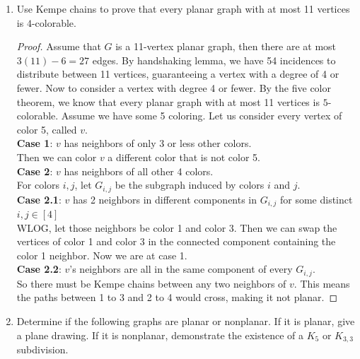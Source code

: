 \documentclass[12pt]{article}
\begin{document}
	\begin{enumerate}

\item Use Kempe chains to prove that every planar graph with at most 11 vertices is $4$-colorable.
\begin{proof}
	Assume that $G$ is a 11-vertex planar graph, then there are at most $3(11)-6=27$ edges. By handshaking lemma, we have 54 incidences to distribute between 11 vertices, guaranteeing a vertex with a degree of 4 or fewer. Now to consider a vertex with degree 4 or fewer.
	By the five color theorem, we know that every planar graph with at most 11 vertices is $5$-colorable. Assume we have some 5 coloring. Let us consider every vertex of color 5, called $v$.\\
	\textbf{Case 1}: $v$ has neighbors of only 3 or less other colors.\\
	Then we can color $v$ a different color that is not color 5.\\
	\textbf{Case 2}: $v$ has neighbors of all other 4 colors.\\
	For colors $i,j$, let $G_{i,j}$ be the subgraph induced by colors $i$ and $j$.\\
	\textbf{Case 2.1}: $v$ has 2 neighbors in different components in $G_{i,j}$ for some distinct $i,j\in [4]$\\
	WLOG, let those neighbors be color 1 and color 3. Then we can swap the vertices of color 1 and color 3 in the connected component containing the color 1 neighbor. Now we are at case 1.\\
	\textbf{Case 2.2}: $v$'s neighbors are all in the same component of every $G_{i,j}$.\\
	So there must be Kempe chains between any two neighbors of $v$. This means the paths between 1 to 3 and 2 to 4 would cross, making it not planar.
	
\end{proof}

\medskip 

\item Determine if the following graphs are planar or nonplanar. If it is planar, give a plane drawing. If it is nonplanar, demonstrate the existence of a $K_5$ or $K_{3,3}$ subdivision.



\end{enumerate}
\end{document}
